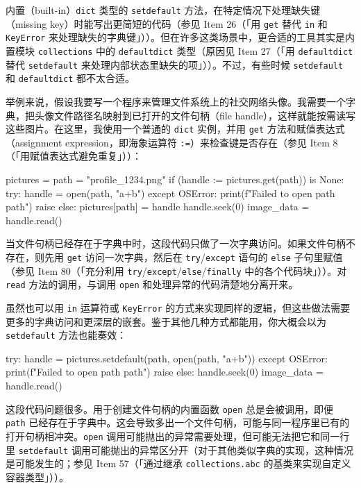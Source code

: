 内置（built-in）\texttt{dict} 类型的 \texttt{setdefault} 方法，在特定情况下处理缺失键（missing key）时能写出更简短的代码（参见 Item 26（「用 \texttt{get} 替代 \texttt{in} 和 \texttt{KeyError} 来处理缺失的字典键」））。但在许多这类场景中，更合适的工具其实是内置模块 \texttt{collections} 中的 \texttt{defaultdict} 类型（原因见 Item 27（「用 \texttt{defaultdict} 替代 \texttt{setdefault} 来处理内部状态里缺失的项」））。不过，有些时候 \texttt{setdefault} 和 \texttt{defaultdict} 都不太合适。

举例来说，假设我要写一个程序来管理文件系统上的社交网络头像。我需要一个字典，把头像文件路径名映射到已打开的文件句柄（file handle），这样就能按需读写这些图片。在这里，我使用一个普通的 \texttt{dict} 实例，并用 \texttt{get} 方法和赋值表达式（assignment expression，即海象运算符 \texttt{:=}）来检查键是否存在（参见 Item 8（「用赋值表达式避免重复」））：

\begin{codebox}[python]
pictures = {}
path = "profile_1234.png"
if (handle := pictures.get(path)) is None:
    try:
        handle = open(path, "a+b")
    except OSError:
        print(f"Failed to open path {path}")
        raise
    else:
        pictures[path] = handle
handle.seek(0)
image_data = handle.read()
\end{codebox}

当文件句柄已经存在于字典中时，这段代码只做了一次字典访问。如果文件句柄不存在，则先用 \texttt{get} 访问一次字典，然后在 \texttt{try}/\texttt{except} 语句的 \texttt{else} 子句里赋值（参见 Item 80（「充分利用 \texttt{try}/\texttt{except}/\texttt{else}/\texttt{finally} 中的各个代码块」））。对 \texttt{read} 方法的调用，与调用 \texttt{open} 和处理异常的代码清楚地分离开来。

虽然也可以用 \texttt{in} 运算符或 \texttt{KeyError} 的方式来实现同样的逻辑，但这些做法需要更多的字典访问和更深层的嵌套。鉴于其他几种方式都能用，你大概会以为 \texttt{setdefault} 方法也能奏效：

\begin{codebox}[python]
try:
    handle = pictures.setdefault(path, open(path, "a+b"))
except OSError:
    print(f"Failed to open path {path}")
    raise
else:
    handle.seek(0)
    image_data = handle.read()
\end{codebox}

这段代码问题很多。用于创建文件句柄的内置函数 \texttt{open} 总是会被调用，即便 \texttt{path} 已经存在于字典中。这会导致多出一个文件句柄，可能与同一程序里已有的打开句柄相冲突。\texttt{open} 调用可能抛出的异常需要处理，但可能无法把它和同一行里 \texttt{setdefault} 调用可能抛出的异常区分开（对于其他类似字典的实现，这种情况是可能发生的；参见 Item 57（「通过继承 \texttt{collections.abc} 的基类来实现自定义容器类型」））。


